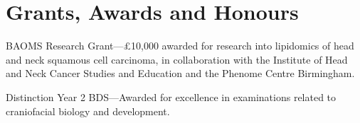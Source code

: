 \section*{Grants, Awards and Honours}

 BAOMS Research Grant---\pounds10,000 awarded for research into lipidomics of head and neck squamous cell carcinoma, in collaboration with the Institute of Head and Neck Cancer Studies and Education and the Phenome Centre Birmingham.

 Distinction Year 2 BDS---Awarded for excellence in examinations related to craniofacial biology and development.
